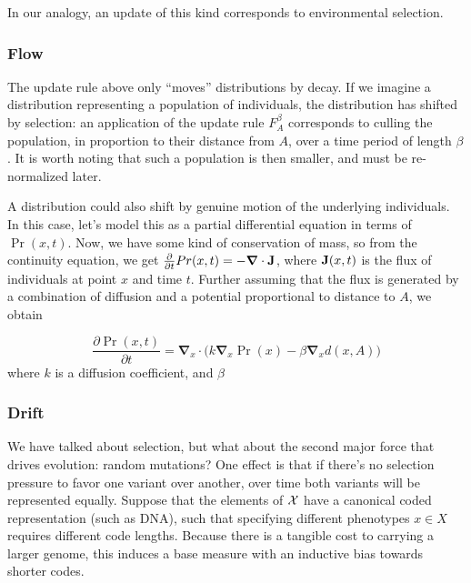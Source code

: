 \documentclass{article}
\begin{document}
In our analogy, an update of this kind corresponds to environmental selection. 



\subsubsection{Flow}
\def\vgrad{\boldsymbol\nabla}
The update rule above only ``moves'' distributions by decay. If we imagine a distribution representing a population of individuals, the distribution has shifted by selection: an application of the update rule $F_A^\beta$ corresponds to culling the population, in proportion to their distance from $A$, over a time period of length $\beta$.
It is worth noting that such a population is then smaller, and must be re-normalized later.

A distribution could also shift by genuine motion of the underlying individuals.
In this case, let's model this as a partial differential equation in terms of $\Pr(x,t)$.
Now, we have some kind of conservation of mass, so from the continuity equation, we get
$\frac{\partial }{\partial t}Pr(x,t) = - \vgrad \cdot \mat J$,
where $\mathbf{J}(x,t)$ is the flux of individuals at point $x$ and time $t$.
Further assuming that the flux is generated by a combination of diffusion and a potential proportional to distance to $A$, we obtain

\[
    \frac{\partial \Pr(x, t)}{\partial t} = \vgrad_{\!x} \cdot \Big( k \vgrad_{\!x} \Pr (x) - \beta \vgrad_{\!x} d(x, A) \Big)
\]
where $k$ is a diffusion coefficient, and $\beta$



\subsubsection{Drift}
We have talked about selection, but what about the second major force that drives evolution: random mutations? 
One effect is that if there's no selection pressure to favor one variant over another, over time both variants will be represented equally.
Suppose that the elements of $\mathcal X$ have a canonical coded representation (such as DNA), such that specifying different phenotypes $x \in X$ requires different code lengths.
Because there is a tangible cost to carrying a larger genome, this induces a base measure with an inductive bias towards shorter codes.  
\end{document}
